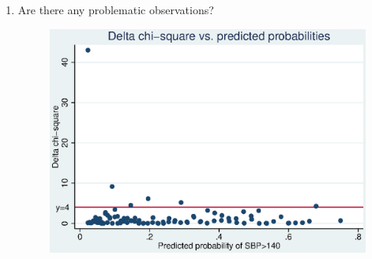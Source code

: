 \documentclass{article}
\begin{document}
  \begin{enumerate}
    \item Are there any problematic observations?
    \begin{figure}
    \centering
    \includegraphics[width=.8\linewidth]{04/part4_Deltachisq_p_.eps}
    \end{figure}


\end{enumerate}
\end{document}
